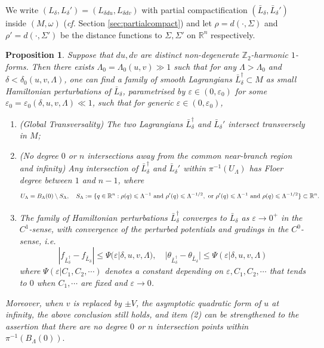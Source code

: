 \documentclass[11pt,a4paper]{article}
\numberwithin{equation}{section}%
\newtheorem{prop}[thm]{Proposition}
\theoremstyle{definition}
\newcommand{\ie}{\emph{i.e.} }
\newcommand{\cf}{\emph{cf.} }
\newcommand{\R}{\mathbb{R}}
\newcommand{\Z}{\mathbb{Z}}
\begin{document}
We write $(L_\delta,L_\delta')=( L_{\delta du},L_{\delta dv})$ with partial compactification $(\bar L_\delta,\bar L_\delta')$ inside $(M,\omega)$ (\cf Section \ref{sec:partialcompact}) and let $\rho=d(\cdot,\Sigma)$ and $\rho'=d(\cdot,\Sigma')$ be the distance functions to $\Sigma,\Sigma'$ on $\R^n$ respectively. 

\begin{prop}\label{prop:perturb}
    Suppose that $du,dv$ are distinct non-degenerate $\Z_2$-harmonic $1$-forms. Then there exists $\Lambda_0=\Lambda_0(u,v)\gg 1$ such that for any $\Lambda>\Lambda_0$ and $\delta< \delta_0(u,v,\Lambda)$, one can find a family of smooth Lagrangians $\bar L_{\delta }^{\dagger}\subset M$ as small Hamiltonian perturbations of $\bar L_{\delta}$, parametrised by $\varepsilon\in (0,\varepsilon_0)$ for some $\varepsilon_0=\varepsilon_0(\delta,u,v,\Lambda)\ll 1$, such that for generic $\varepsilon\in (0,\varepsilon_0)$,
    \begin{enumerate}
        \item [\textnormal{(1)}](Global Transversality) The two Lagrangians $\bar L_{\delta}^\dagger$ and $\bar L_{\delta}'$ intersect transversely in $M$; 
        \item [\textnormal{(2)}] (No degree $0$ or $n$ intersections away from the common near-branch region and infinity) Any intersection of $\bar L_{\delta}^\dagger $ and $\bar L_{\delta}'$ within $\pi^{-1}(U_{\Lambda})$ has Floer degree between $1$ and $n-1$, where
        $$U_\Lambda =B_\Lambda(0)\setminus S_\Lambda,\quad S_{\Lambda}:=\{q\in \R^n:\rho(q)\leqslant \Lambda^{-1}\textnormal{~and~}\rho'(q)\leqslant \Lambda^{-1/2},\textnormal{~or~}\rho'(q)\leqslant \Lambda^{-1}\textnormal{~and~}\rho(q)\leqslant \Lambda^{-1/2}\}\subset \R^n.$$
        
        \item [\textnormal{(3)}] The family of Hamiltonian perturbations $\bar L_{\delta}^\dagger$ converges to $\bar L_\delta$ as $\varepsilon\to 0^+$ in the $C^1$-sense, with convergence of the perturbed potentials and gradings in the $C^0$-sense, \ie
        $$|f_{\bar L_{\delta}^\dagger}-f_{\bar L_{\delta}}|\leqslant \Psi(\varepsilon|\delta,u,v,\Lambda),\quad |\theta_{\bar L_{\delta}^\dagger}-\theta_{\bar L_{\delta}}|\leqslant \Psi(\varepsilon|\delta,u,v,\Lambda)$$
        where $\Psi(\varepsilon|C_1,C_2,\cdots)$ denotes a constant depending on $\varepsilon,C_1,C_2,\cdots$ that tends to $0$ when $C_1,\cdots $ are fixed and $\varepsilon \to 0$. 
        
    \end{enumerate}
    Moreover, when $v$ is replaced by $\pm V$, the asymptotic quadratic form of $u$ at infinity, the above conclusion still holds, and item \textnormal{(2)} can be strengthened to the assertion that there are no degree $0$ or $n$ intersection points within $\pi^{-1}(B_\Lambda(0)).$
\end{prop}
\end{document}
